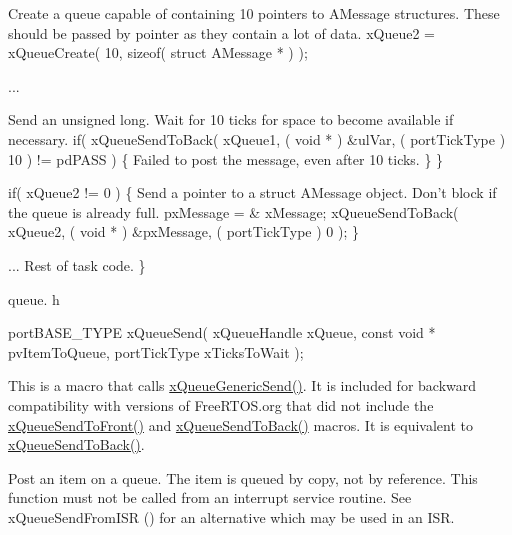 \begin{DoxyPre}Create a queue capable of containing 10 pointers to AMessage structures.
These should be passed by pointer as they contain a lot of data.
    xQueue2 = xQueueCreate( 10, sizeof( struct AMessage * ) );\end{DoxyPre}



\begin{DoxyPre}...
\begin{DoxyVerb}if( xQueue1 != 0 )
{
\end{DoxyVerb}

Send an unsigned long.  Wait for 10 ticks for space to become
available if necessary.
        if( xQueueSendToBack( xQueue1, ( void * ) \&ulVar, ( portTickType ) 10 ) != pdPASS )
        \{
Failed to post the message, even after 10 ticks.
        \}
    \}\end{DoxyPre}



\begin{DoxyPre}    if( xQueue2 != 0 )
    \{
Send a pointer to a struct AMessage object.  Don't block if the
queue is already full.
        pxMessage = \& xMessage;
        xQueueSendToBack( xQueue2, ( void * ) \&pxMessage, ( portTickType ) 0 );
    \}\end{DoxyPre}



\begin{DoxyPre}... Rest of task code.
 \}
 \end{DoxyPre}


queue. h 
\begin{DoxyPre}
 portBASE\_TYPE xQueueSend(
                              xQueueHandle xQueue,
                              const void * pvItemToQueue,
                              portTickType xTicksToWait
                         );
   \end{DoxyPre}


This is a macro that calls \hyperlink{queue_8c_a1d907e5f368f46b58c265fa0bdeb2328}{x\-Queue\-Generic\-Send()}. It is included for backward compatibility with versions of Free\-R\-T\-O\-S.\-org that did not include the \hyperlink{queue_8h_aa612fcc2b1ceee0200f34b942e300b41}{x\-Queue\-Send\-To\-Front()} and \hyperlink{queue_8h_a81d24a2c1199d58efb76fbee15853112}{x\-Queue\-Send\-To\-Back()} macros. It is equivalent to \hyperlink{queue_8h_a81d24a2c1199d58efb76fbee15853112}{x\-Queue\-Send\-To\-Back()}.

Post an item on a queue. The item is queued by copy, not by reference. This function must not be called from an interrupt service routine. See x\-Queue\-Send\-From\-I\-S\-R () for an alternative which may be used in an I\-S\-R.


